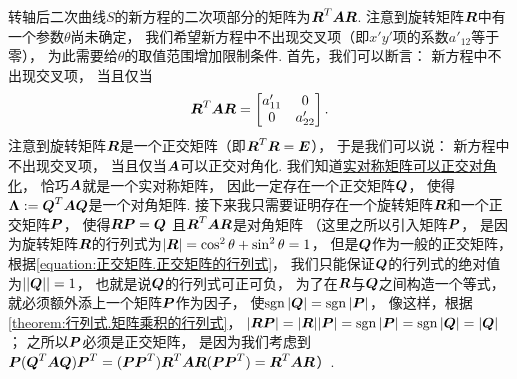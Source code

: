 转轴后二次曲线\(S\)的新方程的二次项部分的矩阵为\(\boldsymbol{R}^T \boldsymbol{A} \boldsymbol{R}\).
注意到旋转矩阵\(\boldsymbol{R}\)中有一个参数\(\theta\)尚未确定，
我们希望新方程中不出现交叉项（即\(x' y'\)项的系数\(a'_{12}\)等于零），
为此需要给\(\theta\)的取值范围增加限制条件.
首先，我们可以断言：
新方程中不出现交叉项，
当且仅当\begin{equation*}
	\boldsymbol{R}^T \boldsymbol{A} \boldsymbol{R}
	= \begin{bmatrix}
		a'_{11} & 0 \\
		0 & a'_{22}
	\end{bmatrix}.
\end{equation*}
注意到旋转矩阵\(\boldsymbol{R}\)是一个正交矩阵（即\(\boldsymbol{R}^T \boldsymbol{R} = \boldsymbol{E}\)），
于是我们可以说：
新方程中不出现交叉项，
当且仅当\(\boldsymbol{A}\)可以正交对角化.
我们知道\hyperref[theorem:实对称矩阵.实对称矩阵可以正交对角化]{实对称矩阵可以正交对角化}，
恰巧\(\boldsymbol{A}\)就是一个实对称矩阵，
因此一定存在一个正交矩阵\(\boldsymbol{Q}\)，
使得\(\boldsymbol\Lambda := \boldsymbol{Q}^T \boldsymbol{A} \boldsymbol{Q}\)是一个对角矩阵.
接下来我只需要证明存在一个旋转矩阵\(\boldsymbol{R}\)和一个正交矩阵\(\boldsymbol{P}\)，
使得\(\boldsymbol{R} \boldsymbol{P} = \boldsymbol{Q}\)
且\(\boldsymbol{R}^T \boldsymbol{A} \boldsymbol{R}\)是对角矩阵
（这里之所以引入矩阵\(\boldsymbol{P}\)，
是因为旋转矩阵\(\boldsymbol{R}\)的行列式为\(
	\abs{\boldsymbol{R}}
	= \cos^2\theta + \sin^2\theta
	= 1
\)，
但是\(\boldsymbol{Q}\)作为一般的正交矩阵，
根据\cref{equation:正交矩阵.正交矩阵的行列式}，
我们只能保证\(\boldsymbol{Q}\)的行列式的绝对值为\(
	\abs{
		\abs{\boldsymbol{Q}}
	}
	= 1
\)，
也就是说\(\boldsymbol{Q}\)的行列式可正可负，
为了在\(\boldsymbol{R}\)与\(\boldsymbol{Q}\)之间构造一个等式，
就必须额外添上一个矩阵\(\boldsymbol{P}\)作为因子，
使\(\operatorname{sgn}\abs{\boldsymbol{Q}} = \operatorname{sgn}\abs{\boldsymbol{P}}\)，
像这样，根据\cref{theorem:行列式.矩阵乘积的行列式}，
\(
	\abs{\boldsymbol{R} \boldsymbol{P}}
	= \abs{\boldsymbol{R}} \abs{\boldsymbol{P}}
	= \operatorname{sgn}\abs{\boldsymbol{P}}
	= \operatorname{sgn}\abs{\boldsymbol{Q}}
	= \abs{\boldsymbol{Q}}
\)；
之所以\(\boldsymbol{P}\)必须是正交矩阵，
是因为我们考虑到\(
	\boldsymbol{P} (\boldsymbol{Q}^T \boldsymbol{A} \boldsymbol{Q}) \boldsymbol{P}^T
	= (\boldsymbol{P} \boldsymbol{P}^T) \boldsymbol{R}^T \boldsymbol{A} \boldsymbol{R} (\boldsymbol{P} \boldsymbol{P}^T)
	= \boldsymbol{R}^T \boldsymbol{A} \boldsymbol{R}
\)）.
